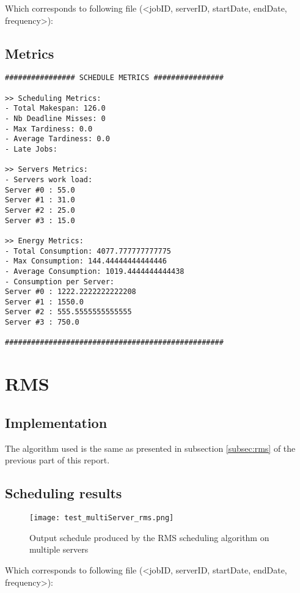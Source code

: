 \documentclass[./report.tex]{subfiles}
\begin{document}
Which corresponds to following file (<jobID, serverID, startDate, endDate, frequency>):


\newpage
\subsection{Metrics}
\begin{lstlisting}[style=txt, caption={Metrics for EDF on multiple servers}]
################ SCHEDULE METRICS ################

>> Scheduling Metrics: 
- Total Makespan: 126.0
- Nb Deadline Misses: 0
- Max Tardiness: 0.0
- Average Tardiness: 0.0
- Late Jobs: 

>> Servers Metrics: 
- Servers work load:
Server #0 : 55.0
Server #1 : 31.0
Server #2 : 25.0
Server #3 : 15.0

>> Energy Metrics: 
- Total Consumption: 4077.777777777775
- Max Consumption: 144.44444444444446
- Average Consumption: 1019.4444444444438
- Consumption per Server: 
Server #0 : 1222.2222222222208
Server #1 : 1550.0
Server #2 : 555.5555555555555
Server #3 : 750.0

##################################################
\end{lstlisting}


\newpage
\section{RMS}
\subsection{Implementation}
The algorithm used is the same as presented in subsection \ref{subsec:rms} of the previous part of this report.

\subsection{Scheduling results}
\begin{figure}[!h]
	\center
	\texttt{[image: test\_multiServer\_rms.png]}
	\caption{Output schedule produced by the RMS scheduling algorithm on multiple servers}
	\label{fig:multiServer_rms} 
\end{figure}

Which corresponds to following file (<jobID, serverID, startDate, endDate, frequency>):

\end{document}
